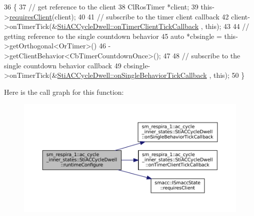 \begin{DoxyCode}
36   \{
37     \textcolor{comment}{// get reference to the client}
38     ClRosTimer *client;
39     this->\hyperlink{classsmacc_1_1ISmaccState_a7f95c9f0a6ea2d6f18d1aec0519de4ac}{requiresClient}(client);
40 
41     \textcolor{comment}{// subscribe to the timer client callback}
42     client->onTimerTick(&\hyperlink{structsm__respira__1_1_1ac__cycle__inner__states_1_1StiACCycleDwell_a8543bc0af22558db94fffb3f89d52816}{StiACCycleDwell::onTimerClientTickCallback}
      , \textcolor{keyword}{this});
43 
44     \textcolor{comment}{// getting reference to the single countdown behavior}
45     \textcolor{keyword}{auto} *cbsingle = this->getOrthogonal<OrTimer>()
46                           ->getClientBehavior<CbTimerCountdownOnce>();
47 
48     \textcolor{comment}{// subscribe to the single countdown behavior callback}
49     cbsingle->onTimerTick(&\hyperlink{structsm__respira__1_1_1ac__cycle__inner__states_1_1StiACCycleDwell_ae47401c4b2d0388058438bc85cccfbba}{StiACCycleDwell::onSingleBehaviorTickCallback}
      , \textcolor{keyword}{this});
50   \}
\end{DoxyCode}
Here is the call graph for this function\+:
\nopagebreak
\begin{figure}[H]
\begin{center}
\leavevmode
\includegraphics[width=350pt]{structsm__respira__1_1_1ac__cycle__inner__states_1_1StiACCycleDwell_a64ecc796ff46fff1b6f285c0b6846cd6_cgraph}
\end{center}
\end{figure}
\mbox{\label{structsm__respira__1_1_1ac__cycle__inner__states_1_1StiACCycleDwell_a9b8f167470c70cc180a8abf704f9e8a0}} 
